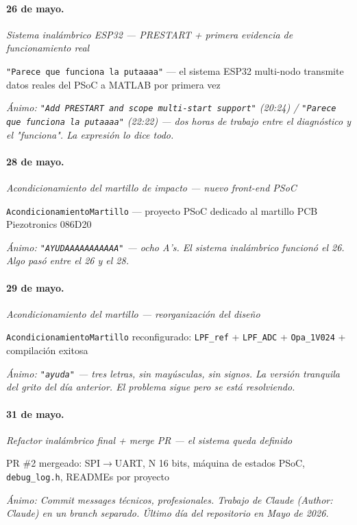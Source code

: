 \paragraph{26 de mayo.}
\emph{Sistema inalámbrico ESP32 --- PRESTART + primera evidencia de funcionamiento real}

\texttt{"Parece que funciona la putaaaa"} --- el sistema ESP32 multi-nodo transmite datos reales del PSoC a MATLAB por primera vez

{\footnotesize\itshape \'Animo: \texttt{"Add PRESTART and scope multi-start support"} (20:24) / \texttt{"Parece que funciona la putaaaa"} (22:22) --- dos horas de trabajo entre el diagnóstico y el "funciona". La expresión lo dice todo.}

\paragraph{28 de mayo.}
\emph{Acondicionamiento del martillo de impacto --- nuevo front-end PSoC}

\texttt{AcondicionamientoMartillo} --- proyecto PSoC dedicado al martillo PCB Piezotronics 086D20

{\footnotesize\itshape \'Animo: \texttt{"AYUDAAAAAAAAAAA"} --- ocho A's. El sistema inalámbrico funcionó el 26. Algo pasó entre el 26 y el 28.}

\paragraph{29 de mayo.}
\emph{Acondicionamiento del martillo --- reorganización del diseño}

\texttt{AcondicionamientoMartillo} reconfigurado: \texttt{LPF\_ref} + \texttt{LPF\_ADC} + \texttt{Opa\_1V024} + compilación exitosa

{\footnotesize\itshape \'Animo: \texttt{"ayuda"} --- tres letras, sin mayúsculas, sin signos. La versión tranquila del grito del día anterior. El problema sigue pero se está resolviendo.}

\paragraph{31 de mayo.}
\emph{Refactor inalámbrico final + merge PR --- el sistema queda definido}

PR \#2 mergeado: SPI$\rightarrow$UART, N 16 bits, máquina de estados PSoC, \texttt{debug\_log.h}, READMEs por proyecto

{\footnotesize\itshape \'Animo: Commit messages técnicos, profesionales. Trabajo de Claude (Author: Claude) en un branch separado. Último día del repositorio en Mayo de 2026.}


